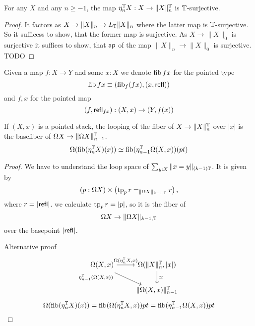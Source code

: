\begin{lemma}
	For any $X$ and any $n \ge -1$, the map $\eta_n^{\mathbb{T}} X : X \to \|X\|_n^{\mathbb{T}}$ is $\mathbb{T}$-surjective.
\end{lemma}
\begin{proof}
	It factors as $X \to \|X\|_n \to L_{\mathbb{T}} \|X\|_n$ where the latter map is $\mathbb{T}$-surjective. So it sufficess to show, that the former map is surjective. As $X \to \|X\|_0$ is surjective it suffices to show, that $\mathsf{ap}$ of the map $\|X\|_n \to \|X\|_0$ is surjective. TODO %
\end{proof}
\begin{notation}
	Given a map $f : X \to Y$ and some $x : X$ we denote $	\operatorname{fib} f x$ for the pointed type
	\[
	\operatorname{fib} f x \equiv (\operatorname{fib}_f (f x) , (x , \mathsf{refl}))
	\]
	and $f , x$ for the pointed map 
	\[
	(f , \mathsf{refl}_{f x}) : (X , x) \to (Y,f(x))
	\]
\end{notation}
\begin{lemma}{\label{lemma:loopOfFiber}}
	If $(X,x)$ is a pointed stack, the looping of the fiber of $X \to \|X\|_{n}^{\mathbb{T}}$ over $|x|$ is the basefiber of $\Omega X \to \|\Omega X\|_{n-1}^{\mathbb{T}}$.
	\[
	\Omega (\operatorname{fib}(\eta_n^{\mathbb{T}} X)(x)) \simeq \operatorname{fib} (\eta_{n-1}^{\mathbb{T}} \Omega (X,x))(pt)
	\]
\end{lemma}
\begin{proof}
	We have to understand the loop space of $\sum_{y : X} \| x = y\|_{(k-1)\mathbb{T}}$. It is given by
	\[(p : \Omega X) \times \left(\operatorname{tp}_p r =_{\|\Omega X\|_{k-1,\mathbb{T}}} r  \right),\]
	where $ r= |\mathsf{refl}|$.
	we calculate $\operatorname{tp}_p r = |p|$, so it is the fiber of 
	\[
	\Omega X  \to \|\Omega X \|_{k-1, \mathbb{T}}
	\]
	over the basepoint $|\mathsf{refl}|$.
	
	Alternative proof
\[\begin{tikzcd}
	{\Omega (X , x)} & {\Omega (\|X\|_n^\bT , |x|) } \\
	& {\|\Omega (X , x)\|_{n-1}^\bT}
	\arrow["{	\Omega (\eta_n^\bT X , x)}", from=1-1, to=1-2]
	\arrow["{\eta_{n-1}^\bT (\Omega (X,x))}"'{pos=0}, shift right, from=1-1, to=2-2]
	\arrow["{\simeq }", from=1-2, to=2-2]
\end{tikzcd}\]
	\[
		\Omega (\operatorname{fib}(\eta_n^{\mathbb{T}} X)(x)) = \operatorname{fib} (\Omega (\eta_n^{\mathbb{T}} X ,x)) pt = \operatorname{fib} (\eta_{n-1}^{\mathbb{T}} \Omega (X ,x)) pt
	\]
\end{proof}
